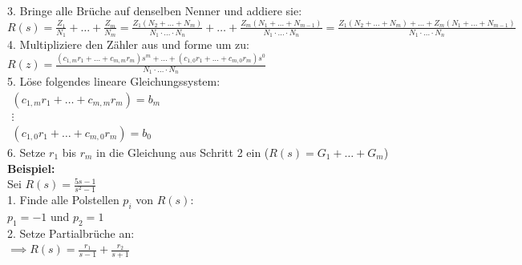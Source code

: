 \documentclass[10pt,a4paper]{article}
\begin{document}
3. Bringe alle Brüche auf denselben Nenner und addiere sie: \\
$R(s) = \frac{Z_1}{N_1} + \dots + \frac{Z_m}{N_m} = \frac{Z_1(N_2 + \dots + N_m)}{N_1 ⋅ \dots ⋅ N_n} + \dots + \frac{Z_m(N_1 + \dots + N_{m-1})}{N_1 ⋅ \dots ⋅ N_n} = \frac{Z_1(N_2 + \dots + N_m) + \dots + Z_m(N_1 + \dots + N_{m-1})}{N_1 ⋅ \dots ⋅ N_n}$ \\

4. Multipliziere den Zähler aus und forme um zu: \\
$ R(z) = \frac{(c_{1,m}r_1 + \dots + c_{m,m}r_m)s^m + \dots + (c_{1,0}r_1 + \dots + c_{m,0}r_m)s^0}{N_1 ⋅ \dots ⋅ N_n}$ \\

5. Löse folgendes lineare Gleichungssystem: \\
$\begin{array}{c}
(c_{1,m}r_1 + \dots + c_{m,m}r_m) = b_m \\
\vdots \\
(c_{1,0}r_1 + \dots + c_{m,0}r_m) = b_0
\end{array}$ \\

6. Setze $r_1$ bis $r_m$ in die Gleichung aus Schritt 2 ein ($R(s) = G_1 + \dots + G_m$) \\

%
%

\textbf{Beispiel:} ~\\
Sei $R(s) = \frac{5s-1}{s^2-1}$ \\

1. Finde alle Polstellen $p_i$ von $R(s):$ \\
$p_1 = -1$ und $p_2 = 1$ \\

2. Setze Partialbrüche an: \\
$\implies R(s) = \frac {r_1} {s - 1} + \frac {r_2} {s + 1}$ \\
\end{document}

